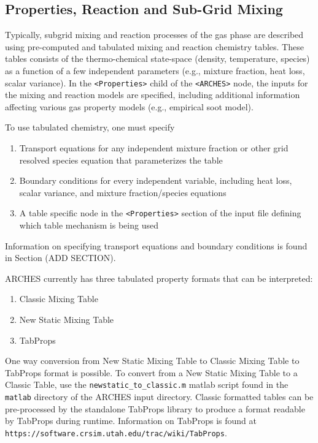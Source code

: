 
\subsection{Properties, Reaction and Sub-Grid Mixing}
% 
Typically, subgrid mixing and reaction processes of the gas phase are described using pre-computed and tabulated mixing and reaction chemistry tables.  These tables consists of the thermo-chemical state-space (density, temperature, species) as a function of a few independent parameters (e.g., mixture fraction, heat loss, scalar variance).  In the \verb=<Properties>= child of the \verb=<ARCHES>= node, the inputs for the mixing and reaction models are specified, including additional information affecting various gas property models (e.g., empirical soot model).  

To use tabulated chemistry, one must specify
\begin{enumerate}
\item Transport equations for any independent mixture fraction or other grid resolved species equation that parameterizes the table
\item Boundary conditions for every independent variable, including heat loss, scalar variance, and mixture fraction/species equations
\item A table specific node in the \verb=<Properties>= section of the input file defining which table mechanism is being used 
\end{enumerate}
Information on specifying transport equations and boundary conditions is found in Section (ADD SECTION).    

ARCHES currently has three tabulated property formats that can be interpreted: 
\begin{enumerate} 
\item Classic Mixing Table 
\item New Static Mixing Table 
\item TabProps
\end{enumerate} 
One way conversion from New Static Mixing Table to Classic Mixing Table to TabProps format is possible.  To convert from a New Static Mixing Table to a Classic Table, use the \verb=newstatic_to_classic.m= matlab script found in the \verb=matlab= directory of the ARCHES input directory.  Classic formatted tables can be pre-processed by the standalone TabProps library to produce a format readable by TabProps during runtime.   Information on TabProps is found at \\
\verb=https://software.crsim.utah.edu/trac/wiki/TabProps=.

